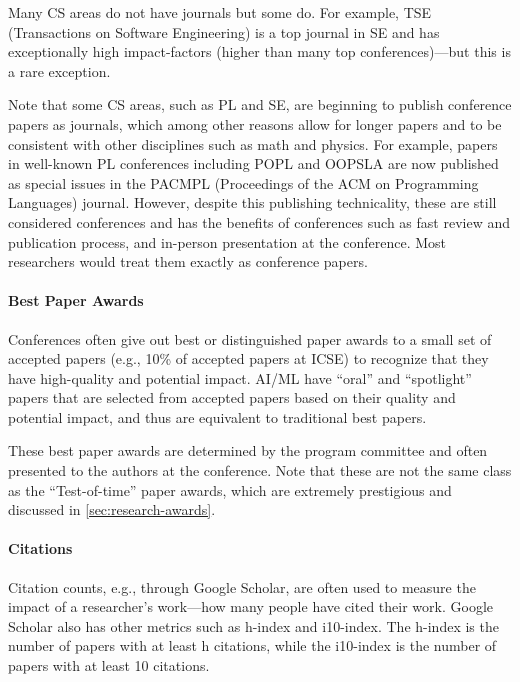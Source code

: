 \documentclass[oneside,11pt]{book}
\newenvironment{commentbox}[1][]{
  \small
  \begin{marker}[\faChessPawn{}]
    {\textbf{#1}}
  }{
  \end{marker}
}
\begin{document}
Many CS areas do not have journals but some do. For example, TSE (Transactions on Software Engineering) is a top journal in SE and has exceptionally high impact-factors (higher than many top conferences)---but this is a rare exception.


\begin{commentbox}
Note that some CS areas, such as PL and SE, are beginning to publish conference papers as journals, which among other reasons allow for  longer papers and to be consistent with other disciplines such as math and physics. For example, papers in well-known PL conferences including  POPL and OOPSLA are now published as special issues in the PACMPL (Proceedings of the ACM on Programming Languages) journal. However, despite this publishing technicality, these are still considered conferences and has the benefits of conferences such as fast review and publication process, and in-person presentation at the conference. Most researchers would treat them exactly as conference papers. 
\end{commentbox}

\paragraph{Best Paper Awards} Conferences often give out best or distinguished paper awards to a small set of accepted papers (e.g., 10\% of accepted papers at ICSE) to recognize that they have high-quality and potential impact.
AI/ML have ``oral'' and ``spotlight'' papers that are selected from accepted papers based on their quality and potential impact, and thus are equivalent to traditional best papers.

These best paper awards are determined by the program committee and often presented to the authors at the conference. Note that these are not the same class as the ``Test-of-time'' paper awards, which are extremely prestigious and
discussed in \autoref{sec:research-awards}.

\paragraph{Citations} Citation counts, e.g., through Google Scholar, are often used to measure the impact of a researcher's work---how many people have cited their work. Google Scholar also has other metrics such as h-index and i10-index. The h-index is the number of papers with at least h citations, while the i10-index is the number of papers with at least 10 citations.  
\end{document}

